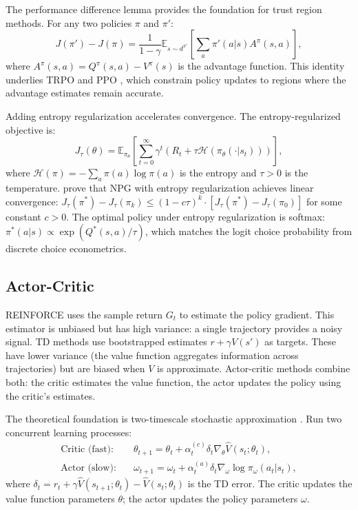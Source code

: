 The performance difference lemma provides the foundation for trust region methods. For any two policies $\pi$ and $\pi'$:
\begin{equation}
J(\pi') - J(\pi) = \frac{1}{1-\gamma} \mathbb{E}_{s \sim d^{\pi'}} \left[ \sum_a \pi'(a|s) A^\pi(s,a) \right],
\label{eq:performance_difference}
\end{equation}
where $A^\pi(s,a) = Q^\pi(s,a) - V^\pi(s)$ is the advantage function. This identity underlies TRPO \citep{Schulman2015} and PPO \citep{Schulman2017}, which constrain policy updates to regions where the advantage estimates remain accurate.

Adding entropy regularization accelerates convergence. The entropy-regularized objective is:
\begin{equation}
J_\tau(\theta) = \mathbb{E}_{\pi_\theta} \left[ \sum_{t=0}^\infty \gamma^t \left( R_t + \tau \mathcal{H}(\pi_\theta(\cdot|s_t)) \right) \right],
\end{equation}
where $\mathcal{H}(\pi) = -\sum_a \pi(a) \log \pi(a)$ is the entropy and $\tau > 0$ is the temperature. \citet{cen2022fast} prove that NPG with entropy regularization achieves linear convergence: $J_\tau(\pi^*) - J_\tau(\pi_k) \leq (1 - c\tau)^k \cdot [J_\tau(\pi^*) - J_\tau(\pi_0)]$ for some constant $c > 0$. The optimal policy under entropy regularization is softmax: $\pi^*(a|s) \propto \exp(Q^*(s,a)/\tau)$, which matches the logit choice probability from discrete choice econometrics.


\subsection{Actor-Critic}
\label{sec:actor_critic}

REINFORCE uses the sample return $G_t$ to estimate the policy gradient. This estimator is unbiased but has high variance: a single trajectory provides a noisy signal. TD methods use bootstrapped estimates $r + \gamma V(s')$ as targets. These have lower variance (the value function aggregates information across trajectories) but are biased when $V$ is approximate. Actor-critic methods combine both: the critic estimates the value function, the actor updates the policy using the critic's estimates.

The theoretical foundation is two-timescale stochastic approximation \citep{konda2000}. Run two concurrent learning processes:
\begin{align}
\text{Critic (fast):} \quad & \theta_{t+1} = \theta_t + \alpha_t^{(c)} \delta_t \nabla_\theta \hat{V}(s_t; \theta_t), \\
\text{Actor (slow):} \quad & \omega_{t+1} = \omega_t + \alpha_t^{(a)} \delta_t \nabla_\omega \log \pi_\omega(a_t|s_t),
\end{align}
where $\delta_t = r_t + \gamma \hat{V}(s_{t+1}; \theta_t) - \hat{V}(s_t; \theta_t)$ is the TD error. The critic updates the value function parameters $\theta$; the actor updates the policy parameters $\omega$.

